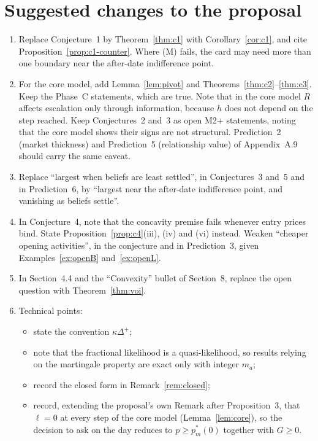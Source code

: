 \documentclass[11pt,a4paper]{article}
\theoremstyle{definition}
\theoremstyle{remark}
\begin{document}
\section{Suggested changes to the proposal}

\begin{enumerate}
\item Replace Conjecture~1 by Theorem~\ref{thm:c1} with Corollary~\ref{cor:c1}, and cite Proposition~\ref{prop:c1-counter}. Where (M) fails, the card may need more than one boundary near the after-date indifference point.
\item For the core model, add Lemma~\ref{lem:pivot} and Theorems~\ref{thm:c2}--\ref{thm:c3}. Keep the Phase~C statements, which are true. Note that in the core model $R$ affects escalation only through information, because $h$ does not depend on the step reached. Keep Conjectures~2 and~3 as open M2+ statements, noting that the core model shows their signs are not structural. Prediction~2 (market thickness) and Prediction~5 (relationship value) of Appendix~A.9 should carry the same caveat.
\item Replace ``largest when beliefs are least settled'', in Conjectures~3 and~5 and in Prediction~6, by ``largest near the after-date indifference point, and vanishing as beliefs settle''.
\item In Conjecture~4, note that the concavity premise fails whenever entry prices bind. State Proposition~\ref{prop:c4}(iii), (iv) and (vi) instead. Weaken ``cheaper opening activities'', in the conjecture and in Prediction~3, given Examples~\ref{ex:openB} and~\ref{ex:openL}.
\item In Section~4.4 and the ``Convexity'' bullet of Section~8, replace the open question with Theorem~\ref{thm:voi}.
\item Technical points:
\begin{itemize}[nosep]
\item state the convention $\kappa\Delta^+$;
\item note that the fractional likelihood is a quasi-likelihood, so results relying on the martingale property are exact only with integer $m_a$;
\item record the closed form in Remark~\ref{rem:closed};
\item record, extending the proposal's own Remark after Proposition~3, that $\ell=0$ at every step of the core model (Lemma~\ref{lem:core}), so the decision to ask on the day reduces to $p\ge p^*_m(0)$ together with $G\ge0$.
\end{itemize}
\end{enumerate}
\end{document}
